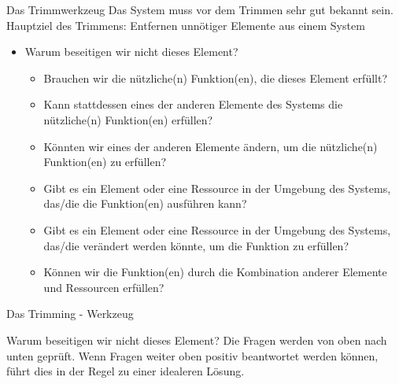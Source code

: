 \documentclass{beamer}
\begin{document}
	\begin{frame}{Das Trimmwerkzeug}
	Das System muss vor dem Trimmen sehr gut bekannt sein. \\
	Hauptziel des Trimmens: Entfernen unnötiger Elemente aus einem System
		\begin{itemize}
			\item Warum beseitigen wir nicht dieses Element?
			\begin{itemize}
    			\item Brauchen wir die nützliche(n) Funktion(en), die dieses Element erfüllt?
    			\item Kann stattdessen eines der anderen Elemente des Systems die nützliche(n) Funktion(en) erfüllen?
    			\item Könnten wir eines der anderen Elemente ändern, um die nützliche(n) Funktion(en) zu erfüllen?
    			\item Gibt es ein Element oder eine Ressource in der Umgebung des Systems, das/die die Funktion(en) ausführen kann?
    			\item Gibt es ein Element oder eine Ressource in der Umgebung des Systems, das/die verändert werden könnte, um die Funktion zu erfüllen?
    			\item Können wir die Funktion(en) durch die Kombination anderer Elemente und Ressourcen erfüllen?
		    \end{itemize}
		\end{itemize}
	\end{frame}
	
	
	\begin{frame}{Das Trimming - Werkzeug}
		\begin{block}{Warum beseitigen wir nicht dieses Element?}
			Die Fragen werden von oben nach unten geprüft. Wenn Fragen weiter oben positiv beantwortet werden können, führt dies in der Regel zu einer idealeren Lösung.
		\end{block}
	\end{frame}
	
\end{document}
